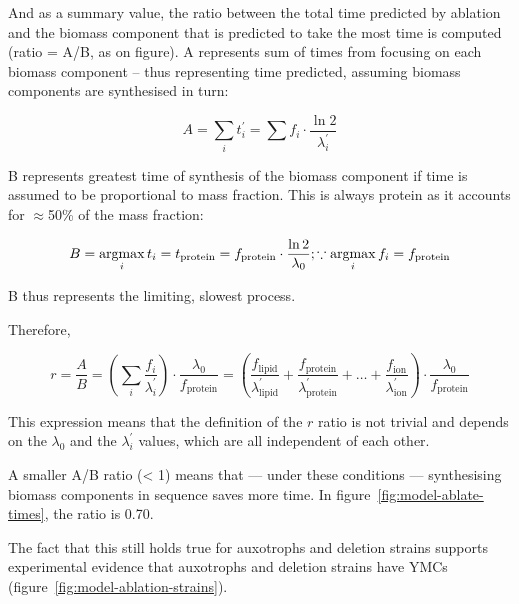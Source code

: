 And as a summary value, the ratio between the total time predicted by ablation and the biomass component that is predicted to take the most time is computed (ratio = A/B, as on figure).
A represents sum of times from focusing on each biomass component -- thus representing time predicted, assuming biomass components are synthesised in turn:

\begin{equation}
  A = \sum_{i} t_{i}^{\prime} = \sum f_{i} \cdot \frac{\ln 2}{\lambda_{i}^{\prime}}
  \label{eq:model-a}
\end{equation}

B represents greatest time of synthesis of the biomass component if time is assumed to be proportional to mass fraction.
This is always protein as it accounts for $\approx$50\% of the mass fraction:

\begin{equation}
  B = \operatorname*{argmax}_{i} t_{i} = t_{\mathrm{protein}} = f_{\mathrm{protein}} \cdot \frac{\ln 2}{\lambda_{0}}; \because \operatorname*{argmax}_{i} f_{i} = f_{\mathrm{protein}}
  \label{eq:model-b}
\end{equation}

B thus represents the limiting, slowest process.

Therefore,

\begin{equation}
  r = \frac{A}{B} = (\sum_i \frac{f_i}{\lambda_i^\prime}) \cdot \frac{\lambda_0}{f_{\mathrm{protein}}} = (\frac{f_{\mathrm{lipid}}}{\lambda_{\mathrm{lipid}}^\prime} + \frac{f_{\mathrm{protein}}}{\lambda_{\mathrm{protein}}^\prime} + \ldots + \frac{f_{\mathrm{ion}}}{\lambda_{\mathrm{ion}}^\prime}) \cdot \frac{\lambda_0}{f_{\mathrm{protein}}}
  \label{eq:model-ratio}
\end{equation}

This expression means that the definition of the $r$ ratio is not trivial and depends on the $\lambda_{0}$ and the $\lambda_{i}^{\prime}$ values, which are all independent of each other.

A smaller A/B ratio (< 1) means that --- under these conditions --- synthesising biomass components in sequence saves more time.
In figure~\ref{fig:model-ablate-times}, the ratio is 0.70.

The fact that this still holds true for auxotrophs and deletion strains supports experimental evidence that auxotrophs and deletion strains have YMCs (figure~\ref{fig:model-ablation-strains}).

